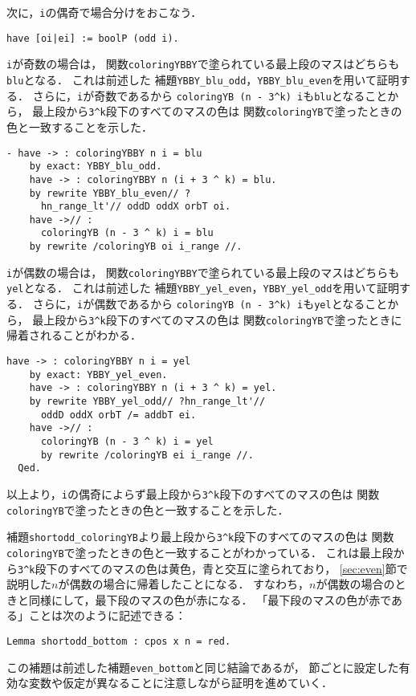 次に，{\tt{i}}の偶奇で場合分けをおこなう．
\begin{lstlisting}[language=Coq]
  have [oi|ei] := boolP (odd i).
\end{lstlisting}
{\tt{i}}が奇数の場合は，
関数{\tt{coloringYBBY}}で塗られている最上段のマスはどちらも{\tt{blu}}となる．
これは前述した
補題{\tt{YBBY\_blu\_odd}}，{\tt{YBBY\_blu\_even}}を用いて証明する．
さらに，{\tt{i}}が奇数であるから
{\tt{coloringYB (n - 3\verb|^|k) i}}も{\tt{blu}}となることから，
最上段から{\tt{3\verb|^|k}}段下のすべてのマスの色は
関数{\tt{coloringYB}}で塗ったときの色と一致することを示した．
\begin{lstlisting}[language=Coq]
  - have -> : coloringYBBY n i = blu
    by exact: YBBY_blu_odd.
    have -> : coloringYBBY n (i + 3 ^ k) = blu.
    by rewrite YBBY_blu_even// ?
      hn_range_lt'// oddD oddX orbT oi.
    have ->// :
      coloringYB (n - 3 ^ k) i = blu
    by rewrite /coloringYB oi i_range //.
\end{lstlisting}
{\tt{i}}が偶数の場合は，
関数{\tt{coloringYBBY}}で塗られている最上段のマスはどちらも{\tt{yel}}となる．
これは前述した
補題{\tt{YBBY\_yel\_even}}，{\tt{YBBY\_yel\_odd}}を用いて証明する．
さらに，{\tt{i}}が偶数であるから
{\tt{coloringYB (n - 3\verb|^|k) i}}も{\tt{yel}}となることから，
最上段から{\tt{3\verb|^|k}}段下のすべてのマスの色は
関数{\tt{coloringYB}}で塗ったときに帰着されることがわかる．
\begin{lstlisting}[language=Coq]
    have -> : coloringYBBY n i = yel
    by exact: YBBY_yel_even.      
    have -> : coloringYBBY n (i + 3 ^ k) = yel.
    by rewrite YBBY_yel_odd// ?hn_range_lt'//
      oddD oddX orbT /= addbT ei.
    have ->// :
      coloringYB (n - 3 ^ k) i = yel
      by rewrite /coloringYB ei i_range //.
  Qed.
\end{lstlisting}
以上より，{\tt{i}}の偶奇によらず最上段から{\tt{3\verb|^|k}}段下のすべてのマスの色は
関数{\tt{coloringYB}}で塗ったときの色と一致することを示した．

補題{\tt{shortodd\_coloringYB}}より最上段から{\tt{3\verb|^|k}}段下のすべてのマスの色は
関数{\tt{coloringYB}}で塗ったときの色と一致することがわかっている．
これは最上段から{\tt{3\verb|^|k}}段下のすべてのマスの色は黄色，青と交互に塗られており，
\ref{sec:even}節で説明した$n$が偶数の場合に帰着したことになる．
すなわち，$n$が偶数の場合のときと同様にして，最下段のマスの色が赤になる．
「最下段のマスの色が赤である」ことは次のように記述できる：
\begin{lstlisting}[language=Coq]
  Lemma shortodd_bottom : cpos x n = red.
\end{lstlisting}
この補題は前述した補題{\tt{even\_bottom}}と同じ結論であるが，
節ごとに設定した有効な変数や仮定が異なることに注意しながら証明を進めていく．

